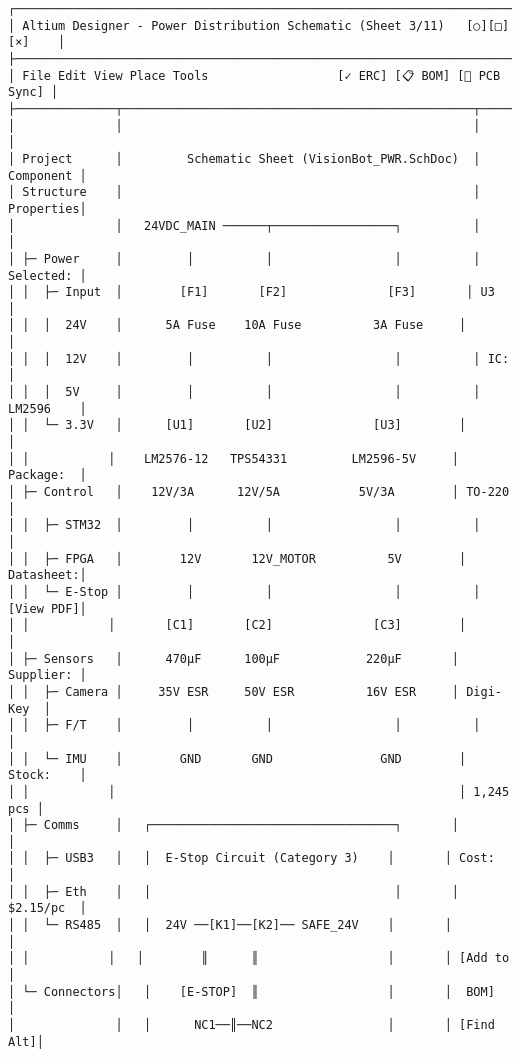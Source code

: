 \documentclass[
]{article}
\begin{document}
\begin{verbatim}
┌────────────────────────────────────────────────────────────────────────────┐
│ Altium Designer - Power Distribution Schematic (Sheet 3/11)   [○][□][×]    │
├────────────────────────────────────────────────────────────────────────────┤
│ File Edit View Place Tools                  [✓ ERC] [📋 BOM] [🔌 PCB Sync] │
├──────────────┬─────────────────────────────────────────────────┬───────────┤
│              │                                                 │           │
│ Project      │         Schematic Sheet (VisionBot_PWR.SchDoc)  │ Component │
│ Structure    │                                                 │ Properties│
│              │   24VDC_MAIN ──────┬─────────────────┐          │           │
│ ├─ Power     │         │          │                 │          │ Selected: │
│ │  ├─ Input  │        [F1]       [F2]              [F3]       │ U3        │
│ │  │  24V    │      5A Fuse    10A Fuse          3A Fuse     │           │
│ │  │  12V    │         │          │                 │          │ IC:       │
│ │  │  5V     │         │          │                 │          │ LM2596    │
│ │  └─ 3.3V   │      [U1]       [U2]              [U3]        │           │
│ │           │    LM2576-12   TPS54331         LM2596-5V     │ Package:  │
│ ├─ Control   │    12V/3A      12V/5A           5V/3A        │ TO-220    │
│ │  ├─ STM32  │         │          │                 │          │           │
│ │  ├─ FPGA   │        12V       12V_MOTOR          5V        │ Datasheet:│
│ │  └─ E-Stop │         │          │                 │          │ [View PDF]│
│ │           │       [C1]       [C2]              [C3]        │           │
│ ├─ Sensors   │      470µF      100µF            220µF       │ Supplier: │
│ │  ├─ Camera │     35V ESR     50V ESR          16V ESR     │ Digi-Key  │
│ │  ├─ F/T    │         │          │                 │          │           │
│ │  └─ IMU    │        GND       GND               GND        │ Stock:    │
│ │           │                                                │ 1,245 pcs │
│ ├─ Comms     │   ┌──────────────────────────────────┐       │           │
│ │  ├─ USB3   │   │  E-Stop Circuit (Category 3)    │       │ Cost:     │
│ │  ├─ Eth    │   │                                  │       │ $2.15/pc  │
│ │  └─ RS485  │   │  24V ──[K1]──[K2]── SAFE_24V    │       │           │
│ │           │   │        ║      ║                  │       │ [Add to   │
│ └─ Connectors│   │    [E-STOP]  ║                  │       │  BOM]     │
│              │   │      NC1──║──NC2                │       │ [Find Alt]│

\end{verbatim}
\end{document}
